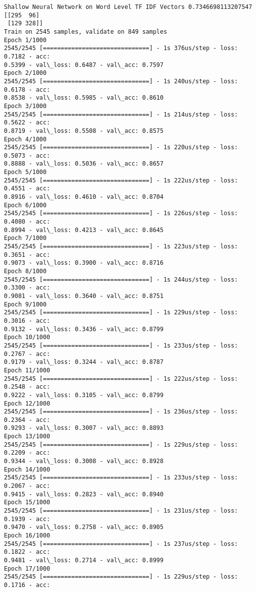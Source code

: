 \documentclass[11pt]{article}
\begin{document}
    \begin{Verbatim}[commandchars=\\\{\}]
Shallow Neural Network on Word Level TF IDF Vectors 0.7346698113207547
[[295  96]
 [129 328]]
Train on 2545 samples, validate on 849 samples
Epoch 1/1000
2545/2545 [==============================] - 1s 376us/step - loss: 0.7182 - acc:
0.5399 - val\_loss: 0.6487 - val\_acc: 0.7597
Epoch 2/1000
2545/2545 [==============================] - 1s 240us/step - loss: 0.6178 - acc:
0.8538 - val\_loss: 0.5985 - val\_acc: 0.8610
Epoch 3/1000
2545/2545 [==============================] - 1s 214us/step - loss: 0.5622 - acc:
0.8719 - val\_loss: 0.5508 - val\_acc: 0.8575
Epoch 4/1000
2545/2545 [==============================] - 1s 220us/step - loss: 0.5073 - acc:
0.8888 - val\_loss: 0.5036 - val\_acc: 0.8657
Epoch 5/1000
2545/2545 [==============================] - 1s 222us/step - loss: 0.4551 - acc:
0.8916 - val\_loss: 0.4610 - val\_acc: 0.8704
Epoch 6/1000
2545/2545 [==============================] - 1s 226us/step - loss: 0.4080 - acc:
0.8994 - val\_loss: 0.4213 - val\_acc: 0.8645
Epoch 7/1000
2545/2545 [==============================] - 1s 223us/step - loss: 0.3651 - acc:
0.9073 - val\_loss: 0.3900 - val\_acc: 0.8716
Epoch 8/1000
2545/2545 [==============================] - 1s 244us/step - loss: 0.3300 - acc:
0.9081 - val\_loss: 0.3640 - val\_acc: 0.8751
Epoch 9/1000
2545/2545 [==============================] - 1s 229us/step - loss: 0.3016 - acc:
0.9132 - val\_loss: 0.3436 - val\_acc: 0.8799
Epoch 10/1000
2545/2545 [==============================] - 1s 233us/step - loss: 0.2767 - acc:
0.9179 - val\_loss: 0.3244 - val\_acc: 0.8787
Epoch 11/1000
2545/2545 [==============================] - 1s 222us/step - loss: 0.2548 - acc:
0.9222 - val\_loss: 0.3105 - val\_acc: 0.8799
Epoch 12/1000
2545/2545 [==============================] - 1s 236us/step - loss: 0.2364 - acc:
0.9293 - val\_loss: 0.3007 - val\_acc: 0.8893
Epoch 13/1000
2545/2545 [==============================] - 1s 229us/step - loss: 0.2209 - acc:
0.9344 - val\_loss: 0.3008 - val\_acc: 0.8928
Epoch 14/1000
2545/2545 [==============================] - 1s 233us/step - loss: 0.2067 - acc:
0.9415 - val\_loss: 0.2823 - val\_acc: 0.8940
Epoch 15/1000
2545/2545 [==============================] - 1s 231us/step - loss: 0.1939 - acc:
0.9470 - val\_loss: 0.2758 - val\_acc: 0.8905
Epoch 16/1000
2545/2545 [==============================] - 1s 237us/step - loss: 0.1822 - acc:
0.9481 - val\_loss: 0.2714 - val\_acc: 0.8999
Epoch 17/1000
2545/2545 [==============================] - 1s 229us/step - loss: 0.1716 - acc:

\end{Verbatim}
\end{document}
